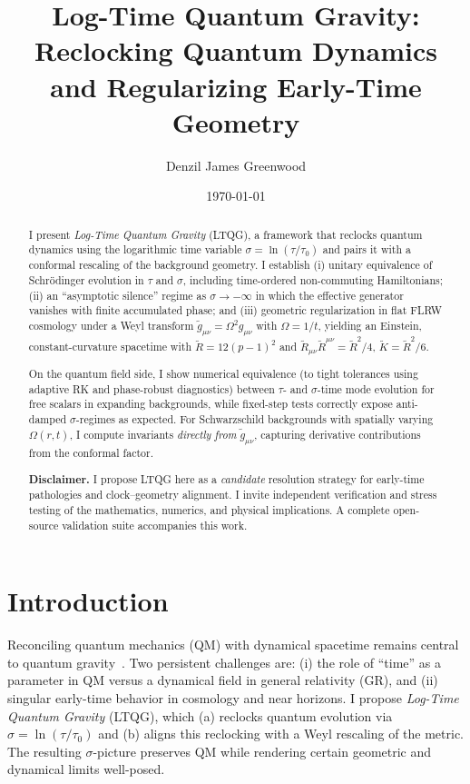 \documentclass[aps,prd,onecolumn,superscriptaddress,nofootinbib]{revtex4-2}
\begin{document}
\title{Log-Time Quantum Gravity: Reclocking Quantum Dynamics and Regularizing Early-Time Geometry}

\author{Denzil James Greenwood}
\date{\today}

\begin{abstract}
I present \emph{Log-Time Quantum Gravity} (LTQG), a framework that reclocks quantum dynamics using the logarithmic time variable $\sigma=\ln(\tau/\tau_0)$ and pairs it with a conformal rescaling of the background geometry. I establish (i) unitary equivalence of Schr\"odinger evolution in $\tau$ and $\sigma$, including time-ordered non-commuting Hamiltonians; (ii) an ``asymptotic silence'' regime as $\sigma\to -\infty$ in which the effective generator vanishes with finite accumulated phase; and (iii) geometric regularization in flat FLRW cosmology under a Weyl transform $\tilde g_{\mu\nu}=\Omega^2 g_{\mu\nu}$ with $\Omega=1/t$, yielding an Einstein, constant-curvature spacetime with $\tilde R=12(p-1)^2$ and $\tilde R_{\mu\nu}\tilde R^{\mu\nu}=\tilde R^2/4$, $\tilde K=\tilde R^2/6$. 

On the quantum field side, I show numerical equivalence (to tight tolerances using adaptive RK and phase-robust diagnostics) between $\tau$- and $\sigma$-time mode evolution for free scalars in expanding backgrounds, while fixed-step tests correctly expose anti-damped $\sigma$-regimes as expected. For Schwarzschild backgrounds with spatially varying $\Omega(r,t)$, I compute invariants \emph{directly from} $\tilde g_{\mu\nu}$, capturing derivative contributions from the conformal factor.

\textbf{Disclaimer.} I propose LTQG here as a \emph{candidate} resolution strategy for early-time pathologies and clock–geometry alignment. I invite independent verification and stress testing of the mathematics, numerics, and physical implications. A complete open-source validation suite accompanies this work.

\end{abstract}

\maketitle

\section{Introduction}
Reconciling quantum mechanics (QM) with dynamical spacetime remains central to quantum gravity~\cite{weinberg1989}. Two persistent challenges are: (i) the role of ``time'' as a parameter in QM versus a dynamical field in general relativity (GR), and (ii) singular early-time behavior in cosmology and near horizons. I propose \emph{Log-Time Quantum Gravity} (LTQG), which (a) reclocks quantum evolution via $\sigma=\ln(\tau/\tau_0)$ and (b) aligns this reclocking with a Weyl rescaling of the metric. The resulting $\sigma$-picture preserves QM while rendering certain geometric and dynamical limits well-posed.
\end{document}
